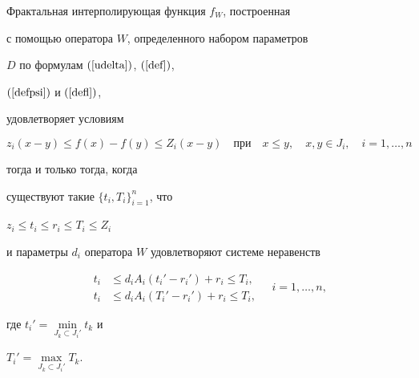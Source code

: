 \begin{thm}


Фрактальная интерполирующая функция $f_W$, построенная


с помощью оператора $W$, определенного набором параметров


$D$ по формулам $(\ref{udelta})$, $(\ref{def})$,


$(\ref{defpsi})$ и $(\ref{defl})$,


удовлетворяет условиям


$$


z_i (x-y) \le f(x)-f(y) \le Z_i (x-y) \quad \text{при} \quad


x\le y, \quad x,y\in J_i, \quad i=1,\dotsc,n


$$


тогда и только тогда, когда


существуют такие $\{t_i,T_i\}_{i=1}^n$, что


$ z_i \le t_i \le r_i \le T_i \le Z_i $


и параметры $d_i$ оператора $W$ удовлетворяют системе неравенств


\begin{equation} \label{teor_1}


\begin{split}


t_i &\le d_i A_i (t_i'-r_i')+r_i \le T_i, \\


t_i &\le d_i A_i (T_i'-r_i')+r_i \le T_i,


\end{split}


\quad i=1,\dotsc,n,


\end{equation}


где $t_i' = \min\limits_{ J_k\subset J_i '} t_k$ и


$T_i' = \max\limits_{ J_k\subset J_i '} T_k$.


\end{thm}





